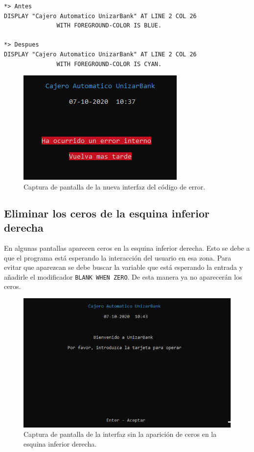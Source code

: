 \documentclass[10pt,a4paper]{article}
\begin{document}
\begin{lstlisting}
*> Antes
DISPLAY "Cajero Automatico UnizarBank" AT LINE 2 COL 26
               WITH FOREGROUND-COLOR IS BLUE.

*> Despues
DISPLAY "Cajero Automatico UnizarBank" AT LINE 2 COL 26
               WITH FOREGROUND-COLOR IS CYAN.
\end{lstlisting}


\begin{figure}[h!]
\centering
\includegraphics[scale=0.75]{images/error.png}
\caption{Captura de pantalla de la nueva interfaz del código de error.}
\label{fig:error}
\end{figure}

\subsection{Eliminar los ceros de la esquina inferior derecha}

En algunas pantallas aparecen ceros en la esquina inferior derecha. Esto se debe a que el programa está esperando la interacción del usuario en esa zona. Para evitar que aparezcan se debe buscar la variable que está esperando la entrada y añadirle el modificador \texttt{BLANK WHEN ZERO}. De esta manera ya no aparecerán los ceros.\\

\begin{figure}[h!]
\centering
\includegraphics[scale=0.75]{images/ceros.png}
\caption{Captura de pantalla de la interfaz sin la aparición de ceros en la esquina inferior derecha.}
\label{fig:error}
\end{figure}
\end{document}
